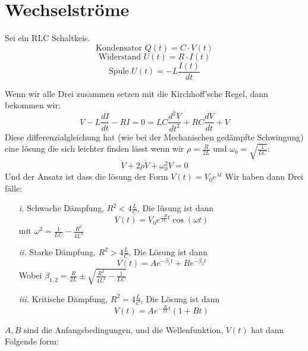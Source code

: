 \documentclass{article}
\begin{document}
\section*{Wechselströme}
\begin{multicols}{2}
Sei ein RLC Schaltkeis.
\[\text{Kondensator } Q(t)=C \cdot V(t)\]
\[\text{Widerstand }U(t)=R \cdot I(t)\]
\[\text{Spule } U(t)=-L \frac{I(t)}{dt} \]
\vfill\null\columnbreak
{}
\end{multicols}
Wenn wir alle Drei zusammen setzen mit die Kirchhoff'sche Regel, dann bekommen wir:
\[V-L \frac{dI}{dt}-RI=0=LC \frac{d^2 V}{dt^2}+RC \frac{dV}{dt}+V\]
Diese differenzialgleichung hat (wie bei der Mechanischen gedämpfte Schwingung) eine lösung die sich leichter finden lässt wenn wir $\rho=\frac{R}{2L}$ und $\omega_0=\sqrt{\frac{1}{LC}}$:
\[\ddot{V}+2\rho\dot{V}+\omega_0^2V=0\]
Und der Ansatz ist dass die lösung der Form $V(t)=V_0e^{\lambda t}$
Wir haben dann Drei fälle:
\begin{itemize}
  \item[\textit{i.}]{Schwache Dämpfung, $R^2<4 \frac{L }{C}$, Die lüsung ist dann \[V(t)=V_0e^{\frac{-R}{2L}t}\cos\left(\omega t\right)\] mit $\omega^2= \frac{1}{LC}-\frac{R^2}{4L^2}$}
  \item[\textit{ii.}]{Starke Dämpfung, $R^2> 4 \frac{L }{C}$, Die Lösung ist dann \[V(t)=Ae^{-\beta_1 t}+B e^{-\beta_2 t}\] Wobei $\beta_{1,2}=\frac{R}{2L}\pm \sqrt{\frac{R^2}{4L^2}-\frac{1}{LC}}$}
  \item[\textit{iii.}]{Kritische Dämpfung, $R^2=4 \frac{L }{C }$, Die Lösung ist dann \[V(t)=Ae^{-\frac{R}{2L}t}(1+Bt)\]}
\end{itemize}
$A,B$ sind die Anfangsbedingungen, und die Wellenfunktion, $V(t)$ hat dann Folgende form:
\begin{center}
\end{center}
\end{document}
